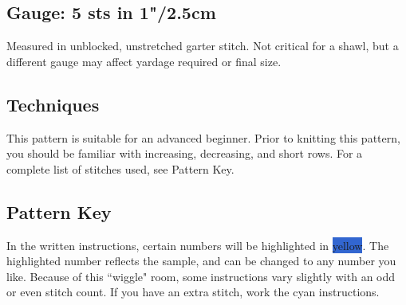 \documentclass[12pt]{article}
\newcommand{\highlighted}[1]{\colorbox{highlight}{#1}} %
\newcommand{\wiggle}[1]{\colorbox{wiggle}{#1}} %
\begin{document}
\begin{titlingpage}
\begin{multicols}{2}
\subsection*{Gauge: 5 sts in 1"/2.5cm}

Measured in unblocked, unstretched garter stitch. Not critical for a shawl, but a different gauge may affect yardage required or final size.


\subsection*{Techniques}

This pattern is suitable for an advanced beginner. %
Prior to knitting this pattern, you should be familiar with increasing, decreasing, and short rows. %
For a complete list of stitches used, see Pattern Key.


\vfill
\columnbreak

\subsection*{Pattern Key}

In the written instructions, certain numbers will be highlighted in \highlighted{yellow}. The highlighted number reflects the sample, and can be changed to any number you like. Because of this ``wiggle" room, some instructions vary slightly with an odd or even stitch count. If you have an extra stitch, work the \wiggle{cyan} instructions.

\vspace{-1em}


\end{multicols}
\end{titlingpage}
\end{document}
